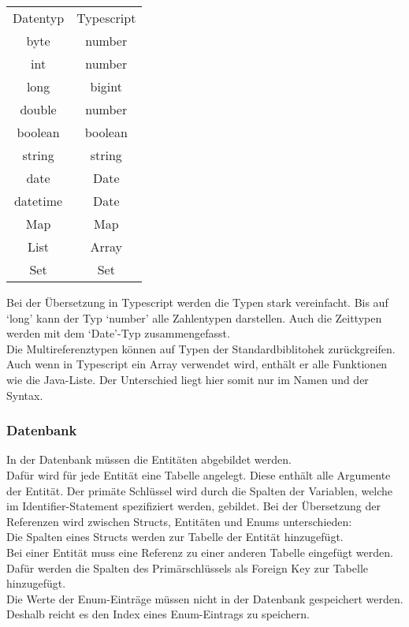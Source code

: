 \documentclass[./einleitung.tex]{subfiles}
\begin{document}
    \begin{center}
        \begin{tabular}{| c || c |}
            \hline
            Datentyp & Typescript \\
            \hhline{|=||=|}
            byte     & number     \\
            \hline
            int      & number     \\
            \hline
            long     & bigint     \\
            \hline
            double   & number     \\
            \hline
            boolean  & boolean    \\
            \hline
            string   & string     \\
            \hline
            date     & Date       \\
            \hline
            datetime & Date       \\
            \hline
            Map & Map\\
            \hline
            List & Array\\
            \hline
            Set & Set\\
            \hline
        \end{tabular}
    \end{center}
    Bei der Übersetzung in Typescript werden die Typen stark vereinfacht.
    Bis auf `long' kann der Typ `number' alle Zahlentypen darstellen.
    Auch die Zeittypen werden mit dem `Date'-Typ zusammengefasst.\\
    Die Multireferenztypen können auf Typen der Standardbiblitohek zurückgreifen.
    Auch wenn in Typescript ein Array verwendet wird, enthält er alle Funktionen wie die Java-Liste.
    Der Unterschied liegt hier somit nur im Namen und der Syntax.

    \subsubsection{Datenbank}\label{subsubsec:db-schema}
    In der Datenbank müssen die Entitäten abgebildet werden.\\
    Dafür wird für jede Entität eine Tabelle angelegt.
    Diese enthält alle Argumente der Entität.
    Der primäte Schlüssel wird durch die Spalten der Variablen, welche im Identifier-Statement spezifiziert werden, gebildet.
    Bei der Übersetzung der Referenzen wird zwischen Structs, Entitäten und Enums unterschieden:\\
    Die Spalten eines Structs werden zur Tabelle der Entität hinzugefügt.\\
    Bei einer Entität muss eine Referenz zu einer anderen Tabelle eingefügt werden.
    Dafür werden die Spalten des Primärschlüssels als Foreign Key zur Tabelle hinzugefügt.\\
    Die Werte der Enum-Einträge müssen nicht in der Datenbank gespeichert werden.
    Deshalb reicht es den Index eines Enum-Eintrags zu speichern.
\end{document}
